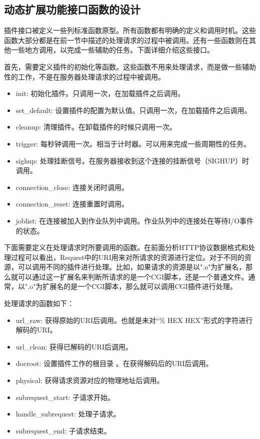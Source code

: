 \documentclass[twoside, xetex]{report}
\begin{document}
\subsection{动态扩展功能接口函数的设计}
	插件接口被定义一些列标准函数原型。所有函数都有明确的定义和调用时机。这些函数大部分都是在前一节中描述的处理请求的过程中被调用。还有一些函数则在其他一些地方调用，以完成一些辅助的任务。下面详细介绍这些接口。
	
	首先，需要定义插件的初始化等函数。这些函数不用来处理请求，而是做一些辅助性的工作，不是在服务器处理请求的过程中被调用。
	\begin{itemize}
		\item init: 初始化插件。只调用一次，在加载插件之后调用。
		\item set\_default: 设置插件的配置为默认值。只调用一次，在加载插件之后调用。
		\item cleanup: 清理插件。在卸载插件的时候只调用一次。
		\item trigger: 每秒钟调用一次。相当于计时器。可以用来完成一些周期性的任务。
		\item sighup: 处理挂断信号。在服务器接收到这个连接的挂断信号（SIGHUP）时调用。
		\item connection\_close: 连接关闭时调用。
		\item connection\_reset: 连接重置时调用。
		\item joblist: 在连接被加入到作业队列中调用。作业队列中的连接处在等待I/O事件的状态。
	\end{itemize}
	
	下面需要定义在处理请求时所要调用的函数。在前面分析HTTP协议数据格式和处理过程可以看出，Request中的URI用来对所请求的资源进行定位。对于不同的资源，可以调用不同的插件进行处理。比如，如果请求的资源是以".o"为扩展名，那么就可以通过这一扩展名来判断所请求的是一个CGI脚本，还是一个普通文件。通常，以".o"为扩展名的是一个CGI脚本，那么就可以调用CGI插件进行处理。
	
	处理请求的函数如下：
	\begin{itemize}
		\item url\_raw: 获得原始的URI后调用。也就是未对“\% HEX HEX”形式的字符进行解码的URI。
		\item url\_clean: 获得已解码的URI后调用。
		\item docroot: 设置插件工作的根目录 。在获得解码后的URI后调用。
		\item physical: 获得请求资源对应的物理地址后调用。
		\item subrequest\_start: 子请求开始。
		\item handle\_subrequest: 处理子请求。
		\item subrequest\_end: 子请求结束。
	\end{itemize}
	
\end{document}
